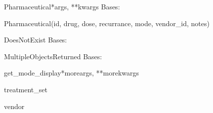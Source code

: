 \documentclass[letterpaper,10pt,english]{sphinxmanual}
\begin{document}
\hypertarget{data.models.Pharmaceutical}{}\begin{classdesc}{Pharmaceutical}{*args, **kwargs}
Bases: 

Pharmaceutical(id, drug, dose, recurrance, mode, vendor\_id, notes)

\hypertarget{data.models.Pharmaceutical.DoesNotExist}{}\begin{excdesc}{DoesNotExist}
Bases: 
\end{excdesc}

\hypertarget{data.models.Pharmaceutical.MultipleObjectsReturned}{}\begin{excdesc}{MultipleObjectsReturned}
Bases: 
\end{excdesc}

\hypertarget{data.models.Pharmaceutical.get\_mode\_display}{}\begin{methoddesc}[Pharmaceutical]{get\_mode\_display}{*moreargs, **morekwargs}\end{methoddesc}

\hypertarget{data.models.Pharmaceutical.treatment\_set}{}\begin{memberdesc}[Pharmaceutical]{treatment\_set}\end{memberdesc}

\hypertarget{data.models.Pharmaceutical.vendor}{}\begin{memberdesc}[Pharmaceutical]{vendor}\end{memberdesc}
\end{classdesc}
\end{document}
